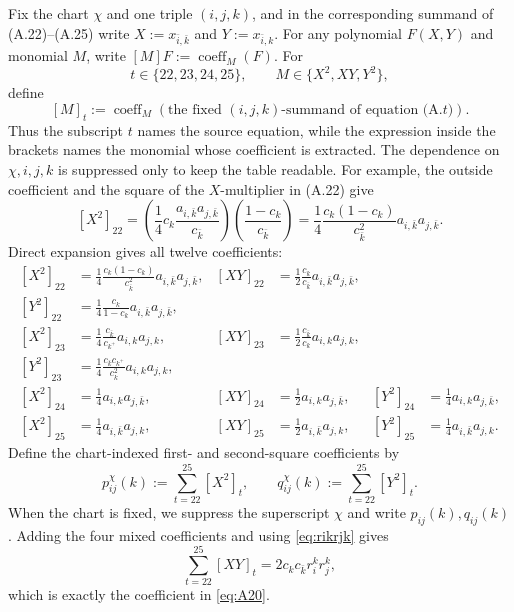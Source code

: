 \documentclass[11pt]{article}
\begin{document}
Fix the chart $\chi$ and one triple $(i,j,k)$, and in the corresponding
summand of (A.22)--(A.25) write
$X:=x_{\bar i,\bar k}$ and $Y:=x_{\bar i,k}$.  For any polynomial
$F(X,Y)$ and monomial $M$, write
$[M]F:=\operatorname{coeff}_M(F)$.  For
\[
t\in\{22,23,24,25\},
\qquad
M\in\{X^2,XY,Y^2\},
\]
define
\[
[M]_t
:=
\operatorname{coeff}_{M}
\left(
\text{the fixed $(i,j,k)$-summand of equation (A.$t$)}
\right).
\]
Thus the subscript $t$ names the source equation, while the expression
inside the brackets names the monomial whose coefficient is extracted.  The
dependence on $\chi,i,j,k$ is suppressed only to keep the table readable.
For example, the outside coefficient and the square of the $X$-multiplier in
(A.22) give
\[
[X^2]_{22}
=
\left(\frac14c_k\frac{a_{i,\bar k}a_{j,\bar k}}{c_{\bar k}}\right)
\left(\frac{1-c_k}{c_{\bar k}}\right)
=
\frac14\frac{c_k(1-c_k)}{c_{\bar k}^2}
a_{i,\bar k}a_{j,\bar k}.
\]
Direct expansion gives all twelve coefficients:
\[
\begin{aligned}
[X^2]_{22}
&=\frac14\frac{c_k(1-c_k)}{c_{\bar k}^2}
  a_{i,\bar k}a_{j,\bar k},&
[XY]_{22}
&=\frac12\frac{c_k}{c_{\bar k}}
  a_{i,\bar k}a_{j,\bar k},\\
[Y^2]_{22}
&=\frac14\frac{c_k}{1-c_k}
  a_{i,\bar k}a_{j,\bar k},\\[1mm]
[X^2]_{23}
&=\frac14\frac{c_{\bar k}}{c_{k^+}}a_{i,k}a_{j,k},&
[XY]_{23}
&=\frac12\frac{c_{\bar k}}{c_k}a_{i,k}a_{j,k},\\
[Y^2]_{23}
&=\frac14\frac{c_{\bar k}c_{k^+}}{c_k^2}a_{i,k}a_{j,k},\\[1mm]
[X^2]_{24}&=\frac14a_{i,k}a_{j,\bar k},&
[XY]_{24}&=\frac12a_{i,k}a_{j,\bar k},&
[Y^2]_{24}&=\frac14a_{i,k}a_{j,\bar k},\\
[X^2]_{25}&=\frac14a_{i,\bar k}a_{j,k},&
[XY]_{25}&=\frac12a_{i,\bar k}a_{j,k},&
[Y^2]_{25}&=\frac14a_{i,\bar k}a_{j,k}.
\end{aligned}
\]
Define the chart-indexed first- and second-square coefficients by
\[
p_{ij}^{\chi}(k):=\sum_{t=22}^{25}[X^2]_t,
\qquad
q_{ij}^{\chi}(k):=\sum_{t=22}^{25}[Y^2]_t.
\]
When the chart is fixed, we suppress the superscript $\chi$ and write
$p_{ij}(k),q_{ij}(k)$.
Adding the four mixed coefficients and using \eqref{eq:rikrjk} gives
\[
\sum_{t=22}^{25}[XY]_{t}
=2c_kc_{\bar k}r_i^kr_j^k,
\]
which is exactly the coefficient in \eqref{eq:A20}.
\end{document}
